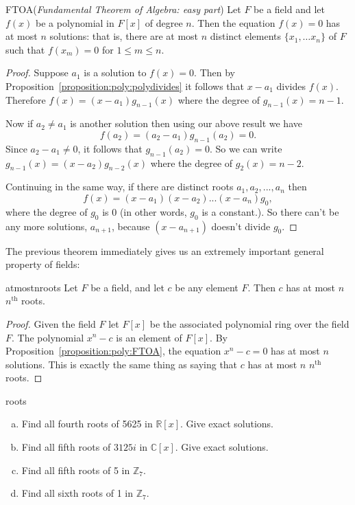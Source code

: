 \begin{prop}{FTOA}(\emph{Fundamental Theorem of Algebra: easy part})
Let $F$ be a field and let $f(x)$ be a polynomial in $F[x]$ of degree $n$. Then the equation $f(x)=0$ has at most $n$ solutions: that is, there are at most $n$ distinct elements $\{x_1,\ldots x_n\}$ of $F$ such that $f(x_m)=0$ for $1 \le m \le n$.
\end {prop}


\begin{proof}
Suppose $a_1$ is a solution to $f(x)=0$. Then by Proposition~\ref{proposition:poly:polydivides} it follows that $x-a_1$ divides $f(x)$. Therefore $f(x) = (x-a_1) g_{n-1}(x)$ where the degree of $g_{n-1}(x)=n-1$. 

Now if $a_2 \neq a_1$ is another solution then using our above result we have
\[ f(a_2) = (a_2 - a_1)g_{n-1}(a_2) = 0. \]
Since $a_2 - a_1 \neq 0$, it follows that $g_{n-1}(a_2) = 0$. So we can write $g_{n - 1}(x) = (x-a_2)g_{n-2}(x)$ where the degree of $g_2(x) = n-2$. 

Continuing in the same way, if there are distinct roots $a_1,a_2,...,a_n$ then 
\[
f(x) = (x - a_1)(x - a_2)...(x - a_n)g_0, \]
 where the degree of $g_0$ is 0 (in other words, $g_0$ is a constant.). So there can't be any more solutions, $a_{n+1}$, because $(x-a_{n+1})$ doesn't divide $g_0$.
\end {proof}

The previous theorem immediately gives us an extremely important general property of fields:

\begin{prop}{atmostnroots}
Let $F$ be a field, and let $c$ be any element $F$.  Then $c$ has at most $n$ $n^{\text{th}}$ roots.
\end {prop}


\begin{proof}
Given the field $F$ let $F[x]$ be the associated polynomial ring over the field $F$. The polynomial $x^n-c$ is an element of $F[x]$. By Proposition~\ref{proposition:poly:FTOA}, the equation $x^n-c=0$ has at most $n$ solutions.  This is exactly the same thing as saying that $c$ has at most $n$ $n^{\text{th}}$ roots.
\end {proof}

\begin{exercise}{roots}
\begin {enumerate}[(a)]
\item
Find all fourth roots of 5625 in $\mathbb{R}[x]$. Give exact solutions.
\item
Find all fifth roots of $3125i$ in $\mathbb{C}[x]$. Give exact solutions. 
\item
Find all fifth roots of 5 in $\mathbb{Z}_7$.
\item
Find all sixth roots of 1 in $\mathbb{Z}_7$.
\end{enumerate}
\end{exercise}

